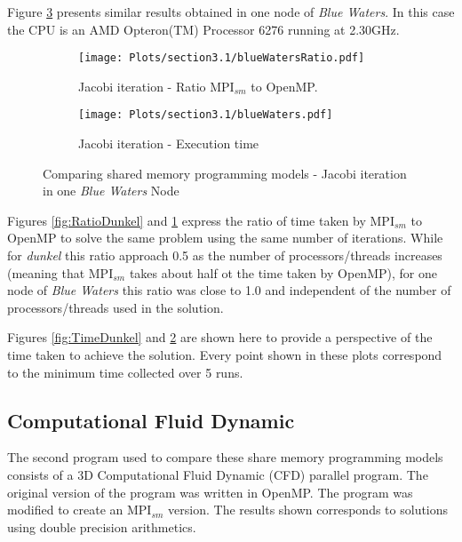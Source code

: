 Figure \ref{fig:Figure2} presents similar results obtained in one node of \emph{Blue Waters}. In this case the CPU is an AMD Opteron(TM) Processor 6276 running at 2.30GHz. 

\begin{figure} [h!]
    \centering
    \captionsetup{justification=raggedright, singlelinecheck=false}
    \begin{subfigure}{.6\textwidth}
      \hspace*{-1.5cm} 
      \texttt{[image: Plots/section3.1/blueWatersRatio.pdf]}
      \caption{Jacobi iteration - Ratio MPI$_{sm}$ to OpenMP.}
      \label{fig:RatioBW}
    \end{subfigure}%
    \begin{subfigure}{.6\textwidth}
      \hspace*{-1.5cm} 
      \texttt{[image: Plots/section3.1/blueWaters.pdf]}
      \caption{Jacobi iteration - Execution time}
      \label{fig:TimeBW}
    \end{subfigure}
\caption{Comparing shared memory programming models - Jacobi iteration in one \emph{Blue Waters} Node}
\label{fig:Figure2}
\end{figure}

\medskip


Figures \ref{fig:RatioDunkel} and \ref{fig:RatioBW} express the ratio of time taken by MPI$_{sm}$ to OpenMP to solve the same problem using the same number of iterations. While for \emph{dunkel} this ratio approach 0.5 as the number of processors/threads increases (meaning that MPI$_{sm}$ takes about half ot the time taken by OpenMP), for one node of \emph{Blue Waters} this ratio was close to 1.0 and independent of the number of processors/threads used in the solution.

\medskip

Figures \ref{fig:TimeDunkel} and \ref{fig:TimeBW} are shown here to provide a perspective of the time taken to achieve the solution. Every point shown in these plots correspond to the minimum time collected over 5 runs.
\medskip



\subsection*{Computational Fluid Dynamic}
The second program used to compare these share memory programming models consists of a 3D Computational Fluid Dynamic (CFD) parallel program. The original version of the program was written in OpenMP. The program was modified to create an MPI$_{sm}$ version. The results shown corresponds to solutions using double precision arithmetics. 

